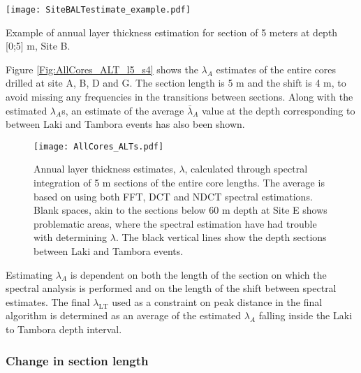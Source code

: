 \documentclass[../../CompleteThesis2/Complete_2ndDraft]{subfiles}
\begin{document}
\begin{marginfigure}
	\centering
	\texttt{[image: SiteBALTestimate\_example.pdf]}
	\caption[$\lambda$ estimation example, Site B, in frequency domain.]{\footnotesize Example of annual layer thickness estimation for section of 5 meters at depth [0;5] m, Site B.}
	\label{Fig:SiteB_0-5m_ALTestimate_example}
\end{marginfigure}
%

Figure \ref{Fig:AllCores_ALT_l5_s4} shows the $\lambda_A$ estimates of the entire cores drilled at site A, B, D and G. The section length is 5 m and the shift is 4 m, to avoid missing any frequencies in the transitions between sections. Along with the estimated $\lambda_A$s, an estimate of the average $\bar{\lambda}_A$ value at the depth corresponding to between Laki and Tambora events has also been shown. 


\begin{figure}[h]
	\centering
	\texttt{[image: AllCores\_ALTs.pdf]}
	\caption[$\lambda$ for Full Cores]{\small Annual layer thickness estimates, $\lambda$, calculated through spectral integration of 5 m sections of the entire core lengths. The average is based on using both FFT, DCT and NDCT spectral estimations. Blank spaces, akin to the sections below 60 m depth at Site E shows problematic areas, where the spectral estimation have had trouble with determining $\lambda$. The black vertical lines show the depth sections between Laki and Tambora events.}
	\label{fig:AllCores_ALT_l5_s4}
\end{figure}

Estimating $\lambda_A$ is dependent on both the length of the section on which the spectral analysis is performed and on the length of the shift between spectral estimates. The final $\lambda_{\text{LT}}$ used as a constraint on peak distance in the final algorithm is determined as an average of the estimated $\lambda_A$ falling inside the Laki to Tambora depth interval.

\subsubsection[Change in $l_{sec}$]{Change in section length}
\label{Subsubsec:SignalAnalysis_SpectralAnalysis_ALT_lsec}
\end{document}
